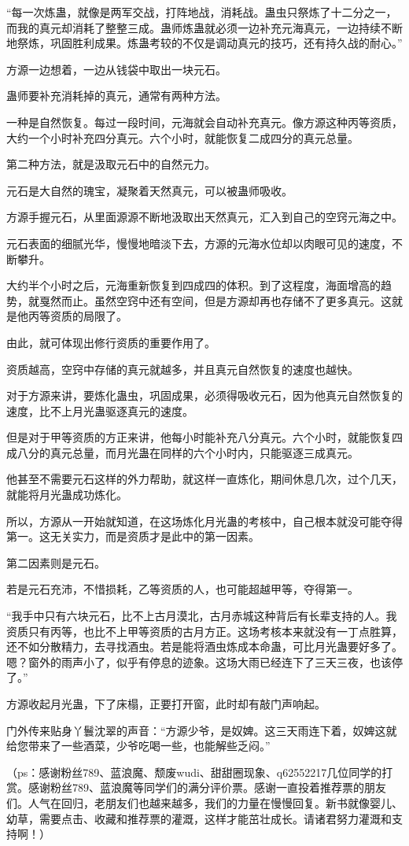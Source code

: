 \begin{this_body}
“每一次炼蛊，就像是两军交战，打阵地战，消耗战。蛊虫只祭炼了十二分之一，而我的真元却消耗了整整三成。蛊师炼蛊就必须一边补充元海真元，一边持续不断地祭炼，巩固胜利成果。炼蛊考较的不仅是调动真元的技巧，还有持久战的耐心。”

方源一边想着，一边从钱袋中取出一块元石。

蛊师要补充消耗掉的真元，通常有两种方法。

一种是自然恢复。每过一段时间，元海就会自动补充真元。像方源这种丙等资质，大约一个小时补充四分真元。六个小时，就能恢复二成四分的真元总量。

第二种方法，就是汲取元石中的自然元力。

元石是大自然的瑰宝，凝聚着天然真元，可以被蛊师吸收。

方源手握元石，从里面源源不断地汲取出天然真元，汇入到自己的空窍元海之中。

元石表面的细腻光华，慢慢地暗淡下去，方源的元海水位却以肉眼可见的速度，不断攀升。

大约半个小时之后，元海重新恢复到四成四的体积。到了这程度，海面增高的趋势，就戛然而止。虽然空窍中还有空间，但是方源却再也存储不了更多真元。这就是他丙等资质的局限了。

由此，就可体现出修行资质的重要作用了。

资质越高，空窍中存储的真元就越多，并且真元自然恢复的速度也越快。

对于方源来讲，要炼化蛊虫，巩固成果，必须得吸收元石，因为他真元自然恢复的速度，比不上月光蛊驱逐真元的速度。

但是对于甲等资质的方正来讲，他每小时能补充八分真元。六个小时，就能恢复四成八分的真元总量，而月光蛊在同样的六个小时内，只能驱逐三成真元。

他甚至不需要元石这样的外力帮助，就这样一直炼化，期间休息几次，过个几天，就能将月光蛊成功炼化。

所以，方源从一开始就知道，在这场炼化月光蛊的考核中，自己根本就没可能夺得第一。这无关实力，而是资质才是此中的第一因素。

第二因素则是元石。

若是元石充沛，不惜损耗，乙等资质的人，也可能超越甲等，夺得第一。

“我手中只有六块元石，比不上古月漠北，古月赤城这种背后有长辈支持的人。我资质只有丙等，也比不上甲等资质的古月方正。这场考核本来就没有一丁点胜算，还不如分散精力，去寻找酒虫。若是能将酒虫炼成本命蛊，可比月光蛊要好多了。嗯？窗外的雨声小了，似乎有停息的迹象。这场大雨已经连下了三天三夜，也该停了。”

方源收起月光蛊，下了床榻，正要打开窗，此时却有敲门声响起。

门外传来贴身丫鬟沈翠的声音：“方源少爷，是奴婢。这三天雨连下着，奴婢这就给您带来了一些酒菜，少爷吃喝一些，也能解些乏闷。”

（ps：感谢粉丝789、蓝浪魔、颓废wudi、甜甜圈现象、q62552217几位同学的打赏。感谢粉丝789、蓝浪魔等同学们的满分评价票。感谢一直投着推荐票的朋友们。人气在回归，老朋友们也越来越多，我们的力量在慢慢回复。新书就像婴儿、幼草，需要点击、收藏和推荐票的灌溉，这样才能茁壮成长。请诸君努力灌溉和支持啊！）

\end{this_body}

